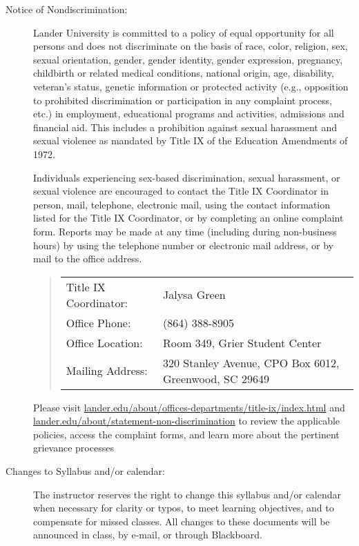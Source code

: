 \documentclass{article}
\begin{document}
\begin{description}
\item[Notice of Nondiscrimination:]

  Lander University is committed to a policy of equal opportunity for all persons and does not discriminate on the basis of race, color, religion, sex, sexual orientation, gender, gender identity, gender expression, pregnancy, childbirth or related medical conditions, national origin, age, disability, veteran’s status, genetic information or protected activity (e.g., opposition to prohibited discrimination or participation in any complaint process, etc.) in employment, educational programs and activities, admissions and financial aid. This includes a prohibition against sexual harassment and sexual violence as mandated by Title IX of the Education Amendments of 1972.

  Individuals experiencing sex-based discrimination, sexual harassment, or sexual violence are encouraged to contact the Title IX Coordinator in person, mail, telephone, electronic mail, using the contact information listed for the Title IX Coordinator, or by completing an online complaint form. Reports may be made at any time (including during non-business hours) by using the telephone number or electronic mail address, or by mail to the office address.

\begin{quote}
  \begin{tabular}{@{}ll@{}}
    Title IX Coordinator: & Jalysa Green\\
    Office Phone: & (864) 388-8905\\
    Office Location: & Room 349, Grier Student Center\\
    Mailing Address: & 320 Stanley Avenue, CPO Box 6012, Greenwood, SC 29649
  \end{tabular}
\end{quote}

  Please visit \href{https://www.lander.edu/about/offices-departments/title-ix/index.html}{lander.edu/about/offices-departments/title-ix/index.html} and \href{https://www.lander.edu/about/statement-non-discrimination}{lander.edu/about/\allowbreak statement\allowbreak -non\allowbreak -discrimination} to review the applicable policies, access the complaint forms, and learn more about the pertinent grievance processes

\item[Changes to Syllabus and/or calendar:]
  The instructor reserves the right to change this syllabus and/or calendar when necessary for clarity or typos, to meet learning objectives, and to compensate for missed classes. All changes to these documents will be announced in class, by e-mail, or through Blackboard.

  \end{description}
\end{document}
